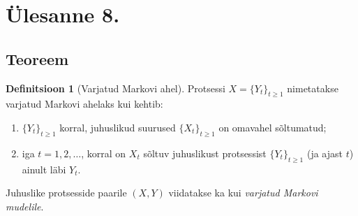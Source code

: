 \documentclass[a4paper,fleqn,12pt]{article}
\theoremstyle{definition}
\newtheorem{definition}{Definitsioon}[section]
\begin{document}
\subsection*{}

\section{Ülesanne 8.}

\subsection{Teoreem}

\begin{definition}[Varjatud Markovi ahel]%
	Protsessi $X = \{Y_t\}_{t\geqslant1}$ nimetatakse varjatud Markovi ahelaks kui kehtib:

	\begin{enumerate}
		\item $\{Y_t\}_{t\geqslant1}$ korral, juhuslikud suurused $\{X_t\}_{t\geqslant1}$ on omavahel sõltumatud;
		\item iga $t = 1,2,\dots$, korral on $X_t$ sõltuv juhuslikust protsessist $\{Y_t\}_{t\geqslant1}$ (ja ajast $t$) ainult läbi $Y_t$.
	\end{enumerate}

	Juhuslike protsesside paarile $(X, Y)$ viidatakse ka kui \textit{varjatud Markovi mudelile}.
\end{definition}
\end{document}
